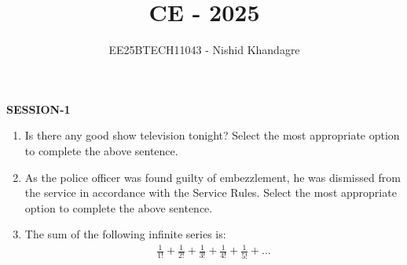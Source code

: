 \documentclass[journal,12pt,onecolumn]{article}
\theoremstyle{remark}
\begin{document}
\title{CE - 2025}
\author{EE25BTECH11043 - Nishid Khandagre}
\date{}
\maketitle

\renewcommand{\thefigure}{\theenumi}
\renewcommand{\thetable}{\theenumi}

\textbf{SESSION-1}


\begin{enumerate}

\item Is there any good show \underline{\hspace{2cm}} television tonight?
Select the most appropriate option to complete the above sentence.

\hfill{}
\begin{enumerate}
\end{enumerate}

\item As the police officer was found guilty of embezzlement, he was \underline{\hspace{2cm}} dismissed from the service in accordance with the Service Rules.
Select the most appropriate option to complete the above sentence.

\hfill{}
\begin{enumerate}
\end{enumerate}

\item The sum of the following infinite series is:
\begin{align} \frac{1}{1!} + \frac{1}{2!} + \frac{1}{3!} + \frac{1}{4!} + \frac{1}{5!} + \dots \end{align}

\hfill{}
\begin{enumerate}
\end{enumerate}


\end{enumerate}
\end{document}
